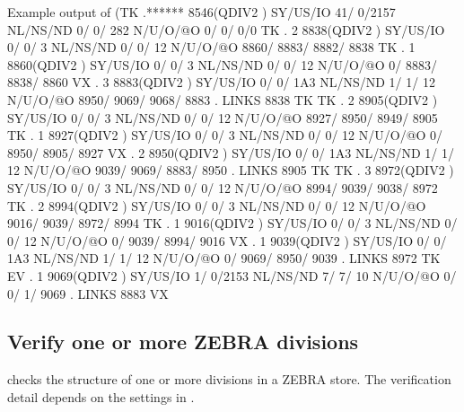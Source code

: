 \begin{Listing}{Example output of }
(TK  .******     8546(QDIV2   ) SY/US/IO   41/    0/2157 NL/NS/ND    0/    0/     282 N/U/O/@O       0/       0/       0/0       
 TK  .     2     8838(QDIV2   ) SY/US/IO    0/    0/   3 NL/NS/ND    0/    0/      12 N/U/O/@O    8860/    8883/    8882/    8838
 TK  .     1     8860(QDIV2   ) SY/US/IO    0/    0/   3 NL/NS/ND    0/    0/      12 N/U/O/@O       0/    8883/    8838/    8860
 VX  .     3     8883(QDIV2   ) SY/US/IO    0/    0/ 1A3 NL/NS/ND    1/    1/      12 N/U/O/@O    8950/    9069/    9068/    8883
     . LINKS      8838 TK                                                                                                        
 TK  .     2     8905(QDIV2   ) SY/US/IO    0/    0/   3 NL/NS/ND    0/    0/      12 N/U/O/@O    8927/    8950/    8949/    8905
 TK  .     1     8927(QDIV2   ) SY/US/IO    0/    0/   3 NL/NS/ND    0/    0/      12 N/U/O/@O       0/    8950/    8905/    8927
 VX  .     2     8950(QDIV2   ) SY/US/IO    0/    0/ 1A3 NL/NS/ND    1/    1/      12 N/U/O/@O    9039/    9069/    8883/    8950
     . LINKS      8905 TK                                                                                                        
 TK  .     3     8972(QDIV2   ) SY/US/IO    0/    0/   3 NL/NS/ND    0/    0/      12 N/U/O/@O    8994/    9039/    9038/    8972
 TK  .     2     8994(QDIV2   ) SY/US/IO    0/    0/   3 NL/NS/ND    0/    0/      12 N/U/O/@O    9016/    9039/    8972/    8994
 TK  .     1     9016(QDIV2   ) SY/US/IO    0/    0/   3 NL/NS/ND    0/    0/      12 N/U/O/@O       0/    9039/    8994/    9016
 VX  .     1     9039(QDIV2   ) SY/US/IO    0/    0/ 1A3 NL/NS/ND    1/    1/      12 N/U/O/@O       0/    9069/    8950/    9039
     . LINKS      8972 TK                                                                                                        
 EV  .     1     9069(QDIV2   ) SY/US/IO    1/    0/2153 NL/NS/ND    7/    7/      10 N/U/O/@O       0/       0/       1/    9069
     . LINKS      8883 VX                                                                                                        
\end{Listing}

\subsection{Verify one or more ZEBRA divisions}



\Action
{} checks the structure of one or more divisions in a ZEBRA store. 
The verification detail depends on the settings in .

